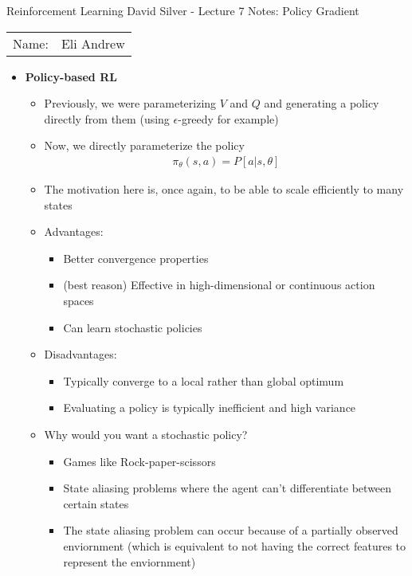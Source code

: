 \documentclass[12pt]{article}
\begin{document}
\begin{center}
{\Large Reinforcement Learning David Silver - Lecture 7 Notes: Policy Gradient}

\begin{tabular}{rl}
Name: & Eli Andrew
\end{tabular}
\end{center}

\begin{itemize}
  \item \textbf{Policy-based RL}
  \begin{itemize}
    \item Previously, we were parameterizing $V$ and $Q$ and generating a policy directly from them
    (using $\epsilon$-greedy for example)
    \item Now, we directly parameterize the policy
    \begin{gather*}
      \pi_\theta(s,a) = P[a | s, \theta]
    \end{gather*}
    \item The motivation here is, once again, to be able to scale efficiently to many states
    \item Advantages:
    \begin{itemize}
      \item Better convergence properties
      \item (best reason) Effective in high-dimensional or continuous action spaces
      \item Can learn stochastic policies
    \end{itemize}
    \item Disadvantages:
    \begin{itemize}
      \item Typically converge to a local rather than global optimum
      \item Evaluating a policy is typically inefficient and high variance
    \end{itemize}
    \item Why would you want a stochastic policy?
    \begin{itemize}
      \item Games like Rock-paper-scissors
      \item State aliasing problems where the agent can't differentiate between certain states
      \item The state aliasing problem can occur because of a partially observed enviornment
      (which is equivalent to not having the correct features to represent the enviornment)

\end{itemize}
\end{itemize}
\end{itemize}
\end{document}
